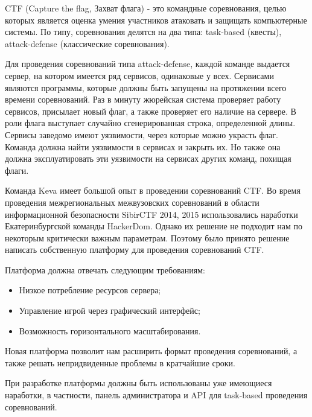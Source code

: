 CTF (Capture the flag, Захват флага) - это командные соревнования, целью которых является оценка умения участников атаковать и защищать компьютерные системы. По типу, соревнования делятся на два типа: task-based (квесты), attack-defense (классические соревнования).

Для проведения соревнований типа attack-defense, каждой команде выдается сервер, на котором имеется ряд сервисов, одинаковые у всех. Сервисами являются программы, которые должны быть запущены на протяжении всего времени соревнований. Раз в минуту жюрейская система проверяет работу сервисов, присылает новый флаг, а также проверяет его наличие на сервере. В роли флага выступает случайно сгенерированная строка, определенной длины. Сервисы заведомо имеют уязвимости, через которые можно украсть флаг. Команда должна найти уязвимости в сервисах и закрыть их. Но также она должна эксплуатировать эти уязвимости на сервисах других команд, похищая флаги. 

Команда Keva имеет большой опыт в проведении соревнований CTF. Во время проведения межрегиональных межвузовских соревнований в области информационной безопасности SibirCTF 2014, 2015 использовались наработки Екатеринбургской команды HackerDom. Однако их решение не подходит нам по некоторым критически важным параметрам. Поэтому  было принято решение написать собственную платформу для проведения соревнований CTF.

Платформа должна отвечать следующим требованиям:
\begin{itemize}
\item Низкое потребление ресурсов сервера;
\item Управление игрой через графический интерфейс;
\item Возможность горизонтального масштабирования.
\end{itemize}

Новая платформа позволит нам расширить формат проведения соревнований, а также решать непридвиденные проблемы в кратчайшие сроки.

При разработке платформы должны быть использованы уже имеющиеся наработки, в частности, панель администратора и API для task-based проведения соревнований. 

